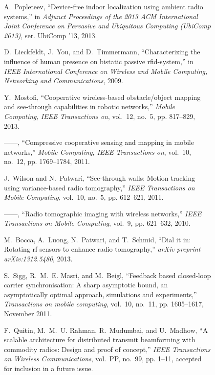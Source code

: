 \documentclass[journal]{IEEEtran}
\begin{document}
\begin{figure*}
\begin{thebibliography}{100}
A.~Popleteev, ``Device-free indoor localization using ambient radio systems,''
  in \emph{Adjunct Proceedings of the 2013 ACM International Joint Conference
  on Pervasive and Ubiquitous Computing (UbiComp 2013)}, ser. UbiComp '13,
  2013.

D.~Lieckfeldt, J.~You, and D.~Timmermann, ``Characterizing the influence of
  human presence on bistatic passive rfid-system,'' in \emph{IEEE International
  Conference on Wireless and Mobile Computing, Networking and Communications},
  2009.

Y.~Mostofi, ``Cooperative wireless-based obstacle/object mapping and
  see-through capabilities in robotic networks,'' \emph{Mobile Computing, IEEE
  Transactions on}, vol.~12, no.~5, pp. 817--829, 2013.

------, ``Compressive cooperative sensing and mapping in mobile networks,''
  \emph{Mobile Computing, IEEE Transactions on}, vol.~10, no.~12, pp.
  1769--1784, 2011.

J.~Wilson and N.~Patwari, ``See-through walls: Motion tracking using
  variance-based radio tomography,'' \emph{IEEE Transactions on Mobile
  Computing}, vol.~10, no.~5, pp. 612--621, 2011.

------, ``Radio tomographic imaging with wireless networks,'' \emph{IEEE
  Transactions on Mobile Computing}, vol.~9, pp. 621--632, 2010.

M.~Bocca, A.~Luong, N.~Patwari, and T.~Schmid, ``Dial it in: Rotating rf
  sensors to enhance radio tomography,'' \emph{arXiv preprint arXiv:1312.5480},
  2013.

S.~Sigg, R.~M.~E. Masri, and M.~Beigl, ``Feedback based closed-loop carrier
  synchronisation: A sharp asymptotic bound, an asymptotically optimal
  approach, simulations and experiments,'' \emph{Transactions on mobile
  computing}, vol.~10, no.~11, pp. 1605--1617, November 2011.

F.~Quitin, M.~M.~U. Rahman, R.~Mudumbai, and U.~Madhow, ``A scalable
  architecture for distributed transmit beamforming with commodity radios:
  Design and proof of concept,'' \emph{IEEE Transactions on Wireless
  Communications}, vol.~PP, no.~99, pp. 1--11, accepted for inclusion in a
  future issue.


\end{thebibliography}
\end{figure*}
\end{document}
